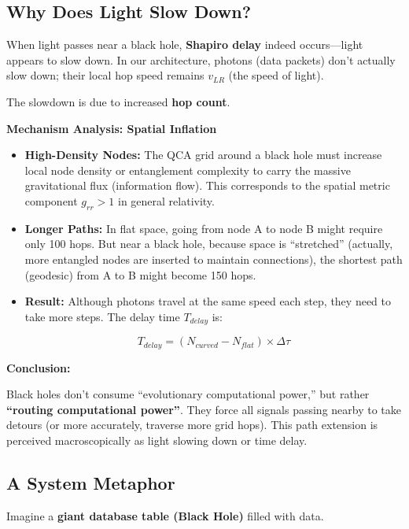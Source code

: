 \subsection{Why Does Light Slow Down?}

When light passes near a black hole, \textbf{Shapiro delay} indeed occurs---light appears to slow down. In our architecture, photons (data packets) don't actually slow down; their local hop speed remains \textbf{$v_{LR}$} (the speed of light).

The slowdown is due to increased \textbf{hop count}.

\textbf{Mechanism Analysis: Spatial Inflation}

\begin{itemize}
\item \textbf{High-Density Nodes:} The QCA grid around a black hole must increase local node density or entanglement complexity to carry the massive gravitational flux (information flow). This corresponds to the spatial metric component \textbf{$g_{rr} > 1$} in general relativity.

\item \textbf{Longer Paths:} In flat space, going from node A to node B might require only 100 hops. But near a black hole, because space is ``stretched'' (actually, more entangled nodes are inserted to maintain connections), the shortest path (geodesic) from A to B might become 150 hops.

\item \textbf{Result:} Although photons travel at the same speed each step, they need to take more steps. The delay time \textbf{$T_{delay}$} is:

    $$T_{delay} = (N_{curved} - N_{flat}) \times \Delta \tau$$
\end{itemize}

\textbf{Conclusion:}

Black holes don't consume ``evolutionary computational power,'' but rather \textbf{``routing computational power''}. They force all signals passing nearby to take detours (or more accurately, traverse more grid hops). This path extension is perceived macroscopically as light slowing down or time delay.

\subsection{A System Metaphor}

Imagine a \textbf{giant database table (Black Hole)} filled with data.

